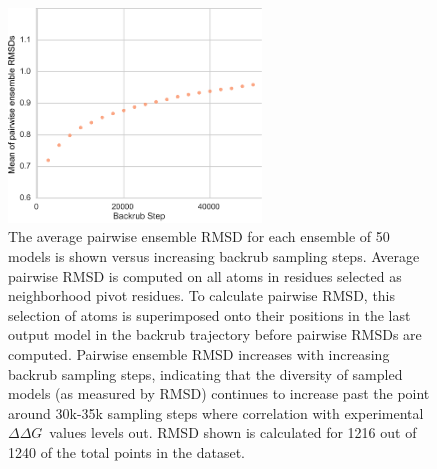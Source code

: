 \documentclass[journal=jpcbfk,manuscript=suppinfo]{achemso}
\newcommand\ddg{$\Delta\Delta G$}
\begin{document}
\begin{figure}
  \centering
  \includegraphics[width=0.6\textwidth,keepaspectratio]{figures/t14-mean-ensemble-error-50k.png}
  \caption{
    The average pairwise ensemble RMSD for each ensemble of 50 models is shown versus increasing backrub sampling steps.
    Average pairwise RMSD is computed on all atoms in residues selected as neighborhood pivot residues.
    To calculate pairwise RMSD, this selection of atoms is superimposed onto their positions in the last output model in the backrub trajectory before pairwise RMSDs are computed.
    Pairwise ensemble RMSD increases with increasing backrub sampling steps, indicating that the diversity of sampled models (as measured by RMSD) continues to increase past the point around 30k-35k sampling steps where correlation with experimental \ddg\ values levels out.
    RMSD shown is calculated for 1216 out of 1240 of the total points in the dataset.
  } \label{fig:t14-mean-ensemble} %
\end{figure}

\end{document}
